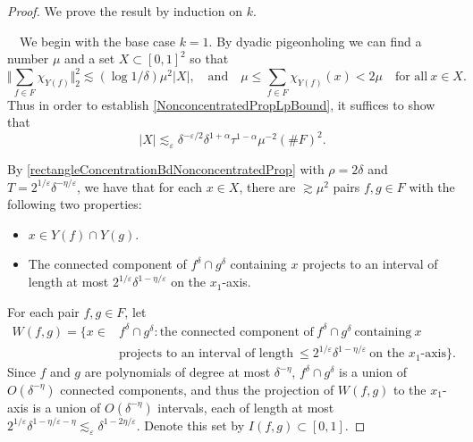 \documentclass[10pt,a4paper]{amsart}
\newcommand{\eps}{\varepsilon}
\begin{document}
\begin{proof}
We prove the result by induction on $k$. 

\medskip

\ \ We begin with the base case $k=1$. By dyadic pigeonholing we can find a number $\mu$ and a set $X\subset[0,1]^2$ so that
\[
\Big \Vert \sum_{f\in F}\chi_{Y(f)}\Big\Vert_2^2\lesssim (\log 1/\delta) \mu^2|X|, \quad\textrm{and}\quad \mu\leq \sum_{f\in F}\chi_{Y(f)}(x)< 2\mu\quad\textrm{for all}\ x\in X.
\]
%
Thus in order to establish \eqref{NonconcentratedPropLpBound}, it suffices to show that
\begin{equation}\label{boundOnSizeOfX}
|X| \lesssim_\eps \delta^{-\eps/2}\delta^{1+\alpha}\tau^{1-\alpha}\mu^{-2}(\#F)^2.
\end{equation}


By \eqref{rectangleConcentrationBdNonconcentratedProp} with $\rho=2\delta$ and $T=2^{1/\eps}\delta^{-\eta/\eps}$, we have that for each $x\in X$, there are $\gtrsim\mu^2$ pairs $f,g\in F$ with the following two properties:
\begin{itemize}
\item[(i)] $x\in Y(f)\cap Y(g)$.
\item[(ii)] The connected component of $f^\delta\cap g^\delta$ containing $x$ projects to an interval of length at most $2^{1/\eps}\delta^{1-\eta/\eps}$ on the $x_1$-axis.
\end{itemize} 
For each pair $f,g\in F$, let 
\begin{equation*}
\begin{split}
W(f,g) = \{x\in & f^\delta\cap g^\delta\colon  \textrm{the connected component of}\ f^\delta\cap g^\delta\ \textrm{containing}\ x \\
& \textrm{projects to an interval of length}\ \leq 2^{1/\eps}\delta^{1-\eta/\eps}\ \textrm{on the $x_1$-axis}\}.
\end{split}
\end{equation*}
Since $f$ and $g$ are polynomials of degree at most $\delta^{-\eta}$, $f^\delta\cap g^\delta$ is a union of $O(\delta^{-\eta})$ connected components, and thus the projection of $W(f,g)$ to the $x_1$-axis is a union of $O(\delta^{-\eta})$ intervals, each of length at most $2^{1/\eps}\delta^{1-\eta/\eps-\eta}\lesssim_\eps \delta^{1-2\eta/\eps}$. Denote this set by $I(f,g)\subset[0,1]$.


\end{proof}
\end{document}
